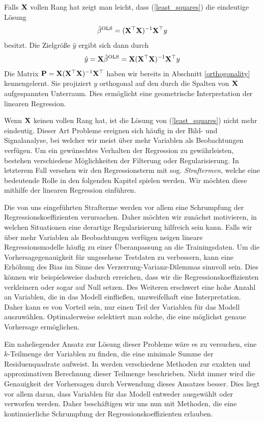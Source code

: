 Falls $\mathbf{X}$ vollen Rang hat zeigt man leicht, dass (\ref{least_squares}) die eindeutige Lösung
\begin{align}
\hat{\beta}^{\text{OLS}} = (\mathbf{X}^{\top}\mathbf{X})^{-1}\mathbf{X}^{\top} y
\end{align}
besitzt. Die Zielgröße $\hat{y}$ ergibt sich dann durch
\begin{align}
\hat{y} = \mathbf{X} \hat{\beta}^{\text{OLS}} = \mathbf{X} (\mathbf{X}^{\top}\mathbf{X})^{-1}\mathbf{X}^{\top} y
\end{align}
Die Matrix $\mathbf{P} = \mathbf{X} (\mathbf{X}^{\top}\mathbf{X})^{-1}\mathbf{X}^{\top}$ haben wir bereits in Abschnitt \ref{orthogonality} kennengelernt. Sie projiziert $y$ orthogonal auf den durch die Spalten von $\mathbf{X}$ aufgespannten Unterraum. Dies ermöglicht eine geometrische Interpretation der linearen Regression.

Wenn $\mathbf{X}$ keinen vollen Rang hat, ist die Lösung von (\ref{least_squares}) nicht mehr eindeutig. Dieser Art Probleme ereignen sich häufig in der Bild- und Signalanalyse, bei welcher wir meist über mehr Variablen als Beobachtungen verfügen. Um ein gewünschtes Verhalten der Regression zu gewährleisten, bestehen verschiedene Möglichkeiten der Filterung oder Regularisierung. In letzterem Fall versehen wir den Regressionsterm mit sog. \textit{Straftermen}, welche eine bedeutende Rolle in den folgenden Kapitel spielen werden. Wir möchten diese mithilfe der linearen Regression einführen.

Die von uns eingeführten Strafterme werden vor allem eine Schrumpfung der Regressionskoeffizienten verursachen. Daher möchten wir zunächst motivieren, in welchen Situationen eine derartige Regularisierung hilfreich sein kann. Falls wir über mehr Variablen als Beobachtungen verfügen neigen lineare Regressionsmodelle häufig zu einer Überanpassung an die Trainingsdaten. Um die Vorhersagegenauigkeit für ungesehene Testdaten zu verbessern, kann eine Erhöhung des Bias im Sinne des Verzerrung-Varianz-Dilemmas sinnvoll sein. Dies können wir beispielsweise dadurch erreichen, dass wir die Regressionskoeffizienten verkleinern oder sogar auf Null setzen. Des Weiteren erschwert eine hohe Anzahl an Variablen, die in das Modell einfließen, unzweifelhaft eine Interpretation. Daher kann es von Vorteil sein, nur einen Teil der Variablen für das Modell auszuwählen. Optimalerweise selektiert man solche, die eine möglichst genaue Vorhersage ermöglichen.

Ein naheliegender Ansatz zur Lösung dieser Probleme wäre es zu versuchen, eine $k$-Teilmenge der Variablen zu finden, die eine minimale Summe der Residuenquadrate aufweist. In \cite{hastie_elements} werden verschiedene Methoden zur exakten und approximativen Berechnung dieser Teilmenge beschrieben. Nicht immer wird die Genauigkeit der Vorhersagen durch Verwendung dieses Ansatzes besser. Dies liegt vor allem daran, dass Variablen für das Modell entweder ausgewählt oder verworfen werden. Daher beschäftigen wir uns nun mit Methoden, die eine kontinuierliche Schrumpfung der Regressionskoeffizienten erlauben.


